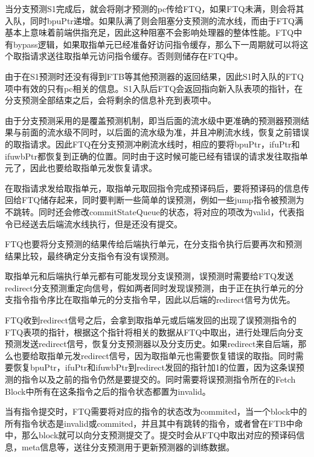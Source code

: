 当分支预测S1完成后，就会将刚才预测的pc传给FTQ，如果FTQ未满，则会将其入队，同时bpuPtr递增。如果队满了则会阻塞分支预测的流水线，而由于FTQ满基本上意味着前端供指充足，因此这种阻塞不会影响处理器的整体性能。FTQ中有bypass逻辑，如果取指单元已经准备好访问指令缓存，那么下一周期就可以将这个取指请求送往取指单元访问指令缓存。否则则储存在FTQ中。

由于在S1预测时还没有得到FTB等其他预测器的返回结果，因此S1时入队的FTQ项中有效的只有pc相关的信息。S1入队后FTQ会返回指向新入队表项的指针，在分支预测全部结束之后，会将剩余的信息补充到表项中。

由于分支预测采用的是覆盖预测机制，即当后面的流水级中更准确的预测器预测结果与前面的流水级不同时，以后面的流水级为准，并且冲刷流水线，恢复之前错误的取指请求。因此FTQ在分支预测冲刷流水线时，相应的要将bpuPtr，ifuPtr和ifuwbPtr都恢复到正确的位置。同时由于这时候可能已经有错误的请求发往取指单元了，因此也要给取指单元发恢复请求。

在取指请求发给取指单元，取指单元取回指令完成预译码后，要将预译码的信息传回给FTQ储存起来，同时要判断一些简单的误预测，例如一些jump指令被预测为不跳转。同时还会修改commitStateQueue的状态，将对应的项改为valid，代表指令已经送去后端流水线执行，但是还没有提交。

FTQ也要将分支预测的结果传给后端执行单元，在分支指令执行后要再次和预测结果比较，最终确定分支指令有没有误预测。

取指单元和后端执行单元都有可能发现分支误预测，误预测时需要给FTQ发送redirect分支预测重定向信号，假如两者同时发现误预测，由于正在执行单元的分支指令指令序比在取指单元的分支指令早，因此以后端的redirect信号为优先。

FTQ收到redirect信号之后，会拿到取指单元或后端发回的出现了误预测指令的FTQ表项的指针，根据这个指针将相关的数据从FTQ中取出，进行处理后向分支预测发送redirect信号，恢复分支预测器以及分支历史。如果redirect来自后端，那么也要给取指单元发redirect信号，因为取指单元也需要恢复错误的取指。同时需要恢复bpuPtr，ifuPtr和ifuwbPtr到redirect发回的指针加1的位置，因为这条误预测的指令以及之前的指令仍然是要提交的。同时需要将误预测指令所在的Fetch Block中所有在这条指令之后的指令状态都置为invalid。

当有指令提交时，FTQ需要将对应的指令的状态改为commited，当一个block中的所有指令状态是invalid或commited，并且其中有跳转的指令，或者曾在FTB中命中，那么block就可以向分支预测提交了。提交时会从FTQ中取出对应的预译码信息，meta信息等，送往分支预测用于更新预测器的训练数据。


